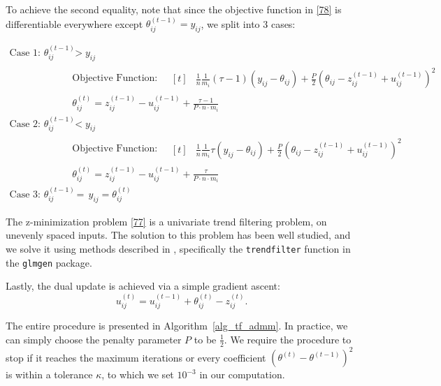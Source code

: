 \documentclass[twoside,11pt]{article}
\begin{document}
To achieve the second equality, note that since the objective function in \eqref{78} is differentiable everywhere except $\theta_{ij}^{(t-1)} = y_{ij}$, we split into 3 cases:

\begin{equation*}
\begin{aligned}
\text{Case 1: } \theta_{ij}^{(t-1)} &> y_{ij} \\
&\text{Objective Function:} \quad \begin{aligned}[t]
    &\frac{1}{n} \frac{1}{m_i}(\tau-1) (y_{ij} - \theta_{ij}) + \frac{P}{2} \left( \theta_{ij} - z_{ij}^{(t-1)} + u_{ij}^{(t-1)} \right)^2
\end{aligned} \\
&\theta_{ij}^{(t)} = z_{ij}^{(t-1)} - u_{ij}^{(t-1)} + \frac{\tau - 1}{P \cdot n \cdot m_i} \\
\text{Case 2: } \theta_{ij}^{(t-1)} &< y_{ij} \\
&\text{Objective Function:} \quad \begin{aligned}[t]
    &\frac{1}{n} \frac{1}{m_i}\tau (y_{ij} - \theta_{ij}) + \frac{P}{2} \left( \theta_{ij} - z_{ij}^{(t-1)} + u_{ij}^{(t-1)} \right)^2
\end{aligned} \\
&\theta_{ij}^{(t)} = z_{ij}^{(t-1)} - u_{ij}^{(t-1)} + \frac{\tau}{P \cdot n \cdot m_i} \\
\text{Case 3: } \theta_{ij}^{(t-1)} &\,=\, y_{ij} = \theta_{ij}^{(t)}
\end{aligned}
\end{equation*}

The z-minimization problem \eqref{77} is a univariate trend filtering problem, on unevenly spaced inputs. The solution to this problem has been well studied, and we solve it using methods described in \cite{ramdas2016fast}, specifically the \texttt{trendfilter} function in the \texttt{glmgen} package.


Lastly, the dual update is achieved via a simple gradient ascent:
\begin{equation}
\label{80}
u_{ij}^{(t)} = u_{ij}^{(t-1)} + \theta_{ij}^{(t)} - z_{ij}^{(t)}.
\end{equation}

The entire procedure is presented in Algorithm~\ref{alg_tf_admm}. In practice, we can simply choose the penalty parameter \( P \) to be \( \frac{1}{2} \). We require the procedure to stop if it reaches the maximum iterations or every coefficient \( (\theta^{(t)} - \theta^{(t-1)})^{2} \) is within a tolerance \( \kappa \), to which we set \( 10^{-3} \) in our computation. 
\end{document}

